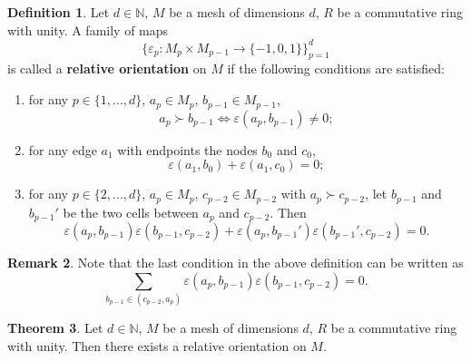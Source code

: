 \documentclass[fleqn]{article}
\theoremstyle{definition}
\newtheorem{theorem}{Theorem}[section]
\newtheorem{definition}[theorem]{Definition}
\newtheorem{remark}[theorem]{Remark}
\begin{document}
\begin{definition}
  Let
    $d \in \mathbb{N}$,
    $M$ be a mesh of dimensions $d$,
    $R$ be a commutative ring with unity.
  A family of maps
  \begin{equation}
    \{\varepsilon_p \colon M_p \times M_{p - 1} \to \{-1, 0, 1\}\}_{p = 1}^d
  \end{equation}
  is called a \textbf{relative orientation} on $M$ if the following conditions
  are satisfied:
  \begin{enumerate}
    \item
      for any $p \in \{1, ..., d\}$, $a_p \in M_p$, $b_{p - 1} \in M_{p - 1}$,
      \begin{equation}
        a_p \succ b_{p - 1} \Leftrightarrow \varepsilon(a_p, b_{p - 1}) \neq 0;
      \end{equation}
    \item
      for any edge $a_1$ with endpoints the nodes $b_0$ and $c_0$,
      \begin{equation}
        \varepsilon(a_1, b_0) + \varepsilon(a_1, c_0) = 0;
      \end{equation}
    \item
      for any
        $p \in \{2, ..., d\}$,
        $a_p \in M_p$,
        $c_{p - 2} \in M_{p - 2}$ with $a_p \succ c_{p - 2}$,
      let $b_{p - 1}$ and $b_{p - 1}'$ be the two
      cells between $a_p$ and $c_{p - 2}$.
      Then
      \begin{equation}
          \varepsilon(a_p, b_{p - 1}) \varepsilon(b_{p - 1}, c_{p - 2}) 
        + \varepsilon(a_p, b_{p - 1}') \varepsilon(b_{p - 1}', c_{p - 2}) = 0.
      \end{equation}
  \end{enumerate}
\end{definition}

\begin{remark}
  Note that the last condition in the above definition can be written as
  \begin{equation}
    \sum _{b_{p - 1} \in (c_{p - 2}, a_p)}
    \varepsilon(a_p, b_{p - 1}) \varepsilon(b_{p - 1}, c_{p - 2}) = 0.
  \end{equation}
\end{remark}

\begin{theorem}
  Let
    $d \in \mathbb{N}$,
    $M$ be a mesh of dimensions $d$,
    $R$ be a commutative ring with unity.
  Then there exists a relative orientation on $M$.
\end{theorem}
\end{document}
